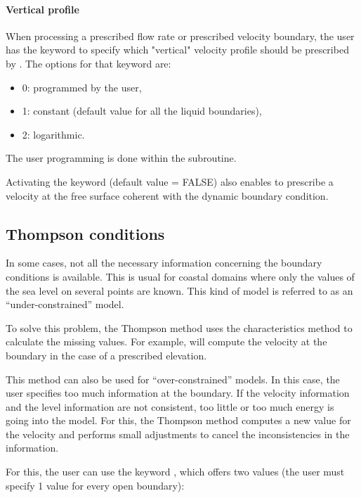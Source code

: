 \paragraph{ Vertical profile}

When processing a prescribed flow rate or prescribed velocity boundary, the
user has the keyword  to specify which
"vertical" velocity profile should be prescribed by . The options for
that keyword are:

\begin{itemize}
\item 0: programmed by the user,

\item 1: constant (default value for all the liquid boundaries),

\item 2: logarithmic.
\end{itemize}

The user programming is done within the  subroutine.

Activating the keyword  (default value =
FALSE) also enables to prescribe a velocity at the free surface coherent with
the dynamic boundary condition.

\subsection{Thompson conditions}

In some cases, not all the necessary information concerning the boundary
conditions is available. This is usual for coastal domains where only the
values of the sea level on several points are known. This kind of model is
referred to as an ``under-constrained'' model.

To solve this problem, the Thompson method uses the characteristics method to
calculate the missing values. For example,  will compute the velocity
at the boundary in the case of a prescribed elevation.

This method can also be used for ``over-constrained'' models. In this case,
the user specifies too much information at the boundary. If the velocity
information and the level information are not consistent, too little or too
much energy is going into the model. For this, the Thompson method computes a
new value for the velocity and performs small adjustments to cancel the
inconsistencies in the information.

For this, the user can use the keyword ,
which offers two values (the user must specify 1 value for every open
boundary):

